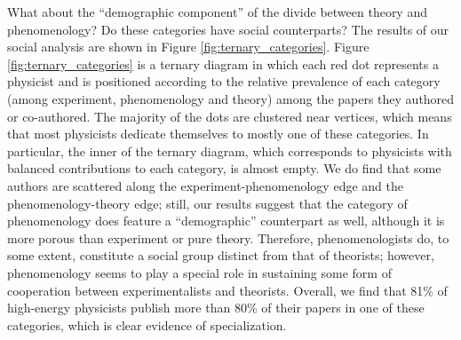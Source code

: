 \documentclass[smallextended]{svjour3}
\begin{document}
What about the ``demographic component'' of the divide between theory and phenomenology? Do these categories have social counterparts? The results of our social analysis are shown in Figure \ref{fig:ternary_categories}. %
Figure \ref{fig:ternary_categories} is a ternary diagram in which each red dot represents a physicist and is positioned according to the relative prevalence of each category (among experiment, phenomenology and theory) among the papers they authored or co-authored. The majority of the dots are clustered near vertices, which means that most physicists dedicate themselves to mostly one of these categories. In particular, the inner of the ternary diagram, which corresponds to physicists with balanced contributions to each category, is almost empty. We do find that some authors are scattered along the experiment-phenomenology edge and the phenomenology-theory edge; still, our results suggest that the category of phenomenology does feature a ``demographic'' counterpart as well, although it is more porous than experiment or pure theory. Therefore, phenomenologists do, to some extent, constitute a social group distinct from that of theorists; however, phenomenology seems to play a special role in sustaining some form of cooperation between experimentalists and theorists. Overall, we find that 81\% of high-energy physicists publish more than 80\% of their papers in one of these categories, which is clear evidence of specialization.

\begin{figure*}
    \centering
    \caption{\textbf{Relative fraction of articles from any of the categories ``Experiment'', ``Phenomenology'' and ``Theory'', for 2,500 \gls{hep} physicists.} Each physicist among those sampled is represented by a red dot on the diagram, positioned according to the estimate of $(p_{i,exp},p_{i,ph},p_{i,th})$, the probability that any of his articles belong to those three categories. The dashed lines, along the direction of the arrows, form a grid along which one can read the relative importance of each category for every physicist  ($p_{ij}\over \sum_{k}p_{ik}$). Physicists near the vertices of the triangle contribute almost exclusively to one category; those near an edge contribute quasi-exclusively to two categeories. Most physicists are located near a vertex, thus contributing to mostly one category.}
    \label{fig:ternary_categories}
\end{figure*}
\end{document}
